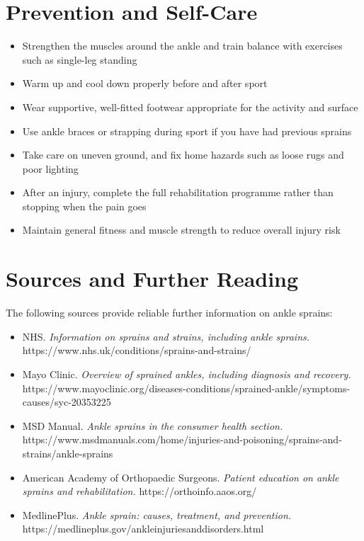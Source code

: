 \section*{Prevention and Self-Care}
\begin{itemize}
    \item Strengthen the muscles around the ankle and train balance with exercises such as single-leg standing
    \item Warm up and cool down properly before and after sport
    \item Wear supportive, well-fitted footwear appropriate for the activity and surface
    \item Use ankle braces or strapping during sport if you have had previous sprains
    \item Take care on uneven ground, and fix home hazards such as loose rugs and poor lighting
    \item After an injury, complete the full rehabilitation programme rather than stopping when the pain goes
    \item Maintain general fitness and muscle strength to reduce overall injury risk
\end{itemize}

\section*{Sources and Further Reading}
The following sources provide reliable further information on ankle sprains:

\begin{itemize}
    \item NHS. \textit{Information on sprains and strains, including ankle sprains.} https://www.nhs.uk/conditions/sprains-and-strains/
    \item Mayo Clinic. \textit{Overview of sprained ankles, including diagnosis and recovery.} https://www.mayoclinic.org/diseases-conditions/sprained-ankle/symptoms-causes/syc-20353225
    \item MSD Manual. \textit{Ankle sprains in the consumer health section.} https://www.msdmanuals.com/home/injuries-and-poisoning/sprains-and-strains/ankle-sprains
    \item American Academy of Orthopaedic Surgeons. \textit{Patient education on ankle sprains and rehabilitation.} https://orthoinfo.aaos.org/
    \item MedlinePlus. \textit{Ankle sprain: causes, treatment, and prevention.} https://medlineplus.gov/ankleinjuriesanddisorders.html
\end{itemize}
